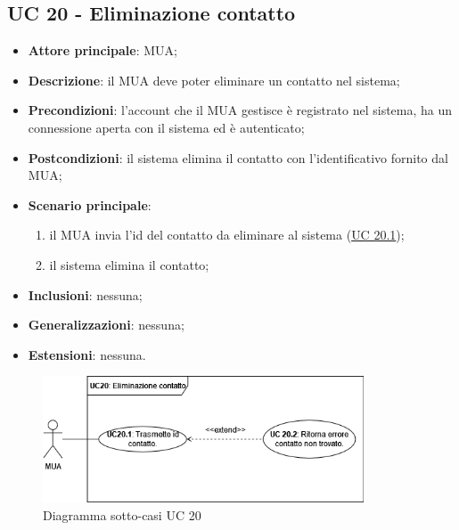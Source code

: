 \subsection{UC 20 - Eliminazione contatto} \label{sec:UC20}
    \begin{itemize}
        \item \textbf{Attore principale}: MUA;
        \item \textbf{Descrizione}: il MUA deve poter eliminare un contatto nel sistema;
        \item \textbf{Precondizioni}: l’account che il MUA gestisce è registrato nel sistema, ha un connessione aperta con il sistema ed è autenticato;
        \item \textbf{Postcondizioni}: il sistema elimina il contatto con l'identificativo fornito dal MUA;
        \item \textbf{Scenario principale}:
            \begin{enumerate}
                \item il MUA invia l'id del contatto da eliminare al sistema (\hyperref[sec:UC20.1]{UC 20.1});
                \item il sistema elimina il contatto;
            \end{enumerate}
        \item \textbf{Inclusioni}: nessuna;
        \item \textbf{Generalizzazioni}: nessuna;
        \item \textbf{Estensioni}: nessuna.
    \end{itemize}

\begin{figure}[h]
    \includegraphics[width=0.85\textwidth]{sections/uc_imgs/UC20.png}
    \centering
    \caption{Diagramma sotto-casi UC 20}
\end{figure}

